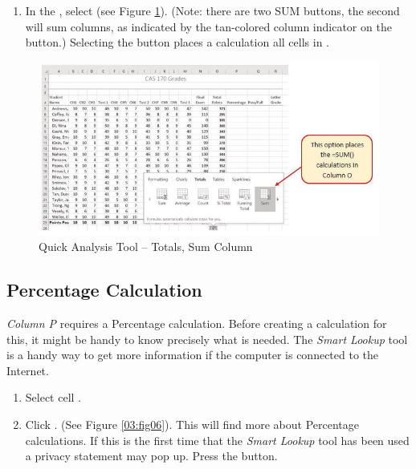 \begin{enumerate}[resume]
	\item In the , select  (see Figure \ref{03:fig05}). (Note: there are two SUM buttons, the second will sum columns, as indicated by the tan-colored column indicator on the button.) Selecting the  button places a  calculation all cells in .
\end{enumerate}

\begin{figure}[H]
	\centering
	\includegraphics[width=\maxwidth{.95\linewidth}]{gfx/ch03_fig05}
	\caption{Quick Analysis Tool – Totals, Sum Column}
	\label{03:fig05}
\end{figure}

\subsection{Percentage Calculation}

\textit{Column P} requires a Percentage calculation. Before creating a calculation for this, it might be handy to know precisely what is needed. The \textit{Smart Lookup} tool is a handy way to get more information if the computer is connected to the Internet.

\begin{enumerate}
	\item Select cell .
	\item Click . (See Figure \ref{03:fig06}). This will find more about Percentage calculations. If this is the first time that the \textit{Smart Lookup} tool has been used a privacy statement may pop up. Press the  button.
\end{enumerate}

